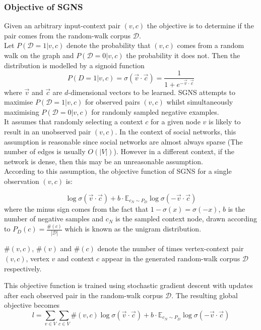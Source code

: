 \documentclass[a4paper]{article}
\renewcommand{\E}{\mathbb E}
\newcommand{\D}{\mathcal D}
\begin{document}
\subsubsection{Objective of SGNS}
Given an arbitrary input-context pair $(v,c)$ the objective is to determine if
the pair comes from the random-walk corpus $\mathcal{D}$.\\
Let $P(\D = 1 | v, c)$ denote the probability that $(v,c)$ comes from a random
walk on the graph and $P(\D = 0| v, c)$
the probability it does not. Then the distribution is modelled by a signoid
function
\[P(D = 1 | v, c) = \sigma(\vec{v} \cdot \vec{c}) = \frac{1}{1 + e^{-\vec{v} \cdot \vec{c}}}\]
where $\vec{v}$ and $\vec{c}$ are $d$-dimensional vectors to be learned. SGNS attempts to maximise $P(\mathcal{D} = 1 | v,c)$ for observed pairs $(v, c)$
whilst simultaneously maximising $P(\D = 0 | v, c)$ for randomly sampled
negative examples.\\
It assumes that randomly selecting a context $c$ for a given
node $v$ is likely to result in an unobserved pair $(v,c)$. In the context of
social networks, this assumption is reasonable since social networks are almost
always sparse (The number of edges is usually $O(|V|)$). However in a different
context, if the network is dense, then this may be an unreasonable assumption.\\

According to this assumption, the objective function of SGNS for a single
observation $(v,c)$ is:

\[\log{\sigma(\vec{v} \cdot \vec{c})} + b \cdot \E_{c_{N} \sim P_D}\log{\sigma(-\vec{v} \cdot \vec{c})}\]
where the minus sign comes from the fact that $1 - \sigma(x) = \sigma(-x)$, $b$
is the number of negative samples and $c_N$ is the sampled context node, drawn
according to $P_D (c) = \frac{\#(c)}{| \D |}$ which is known as the unigram
distribution.\\

\begin{notation} $\#(v,c)$, $\#(v)$ and $\#(c)$ denote the number of times vertex-context pair
  $(v,c)$, vertex $v$ and context $c$ appear in the generated random-walk corpus
  $\mathcal{D}$ respectively.
\end{notation}

This objective function is trained using stochastic gradient descent with
updates after each  observed pair in the random-walk corpus $\D$. The resulting
global objective becomes
\begin{equation}
  l = \sum_{v \in V} \sum_{c \in V}\#(v,c)\log{\sigma(\vec{v} \cdot \vec{c})} +
  b \cdot \E_{c_{N} \sim P_D}\log{\sigma(-\vec{v} \cdot \vec{c})}
\end{equation}
\end{document}
